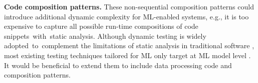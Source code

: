 \textbf{Code composition patterns.} These non-sequential composition patterns could introduce additional dynamic complexity for ML-enabled systems, e.g., it is too expensive to capture all possible run-time compositions of code snippets~with~static analysis. Although dynamic testing is widely adopted~to~complement the limitations of static analysis in traditional software \cite{fairley1978tutorial}, most existing testing techniques tailored for ML only target at ML model level \cite{ml_testing}. It would be beneficial to extend them to include data processing code and composition patterns.
